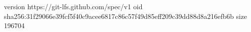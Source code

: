 version https://git-lfs.github.com/spec/v1
oid sha256:31f29066e39fcf5f40c9acee6817c86c57f49d85eff209c39dd88d8a216efb6b
size 196704
